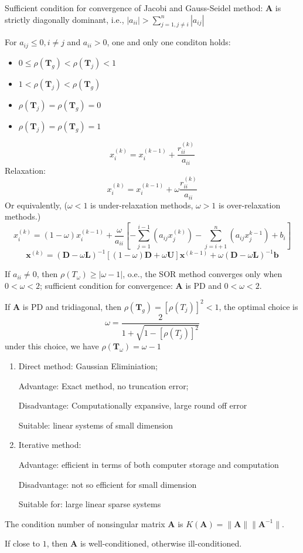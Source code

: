 \begin{proposition}
Sufficient condition for convergence of Jacobi and Gauss-Seidel method: $\bm A$ is strictly diagonally dominant, i.e., $|a_{ii}|>\sum_{j=1,j\ne i}^n|a_{ij}|$
\end{proposition}
\begin{proposition}
For $a_{ij}\le0, i\ne j$ and $a_{ii}>0$, one and only one conditon holds:
\begin{itemize}
\item
$0\le\rho(\bm T_g)<\rho(\bm T_j)<1$
\item
$1<\rho(\bm T_j)<\rho(\bm T_g)$
\item
$\rho(\bm T_j)=\rho(\bm T_g)=0$
\item
$\rho(\bm T_j)=\rho(\bm T_g)=1$
\end{itemize}
\end{proposition}
\begin{definition}
\[
 x_i^{(k)}= x_i^{(k-1)}+\frac{r_{ii}^{(k)}}{a_{ii}}
\]
Relaxation:
\[
x_i^{(k)}= x_i^{(k-1)}+\omega\frac{r_{ii}^{(k)}}{a_{ii}}
\]
Or equivalently, ($\omega<1$ is under-relaxation methods, $\omega>1$ is over-relaxation methods.)
\[
x_i^{(k)}=
(1-\omega)x_i^{(k-1)}+
\frac{\omega}{a_{ii}}
\left[
-\sum_{j=1}^{i-1}(a_{ij}x_j^{(k)})-\sum_{j=i+1}^n(a_{ij}x_j^{k-1})+b_i
\right]
\]
\[
\bm x^{(k)}=(\bm D-\omega\bm L)^{-1}[(1-\omega)\bm D+\omega\bm U]\bm x^{(k-1)}
+
\omega(\bm D-\omega\bm L)^{-1}\bm b
\]
\end{definition}
\begin{proposition}
If $a_{ii}\ne0$, then $\rho(T_\omega)\ge|\omega-1|$, o.e., the SOR method converges only when $0<\omega<2$; sufficient condition for convergence: $\bm A$ is PD and $0<\omega<2$.
\end{proposition}
\begin{proposition}
If $\bm A$ is PD and tridiagonal, then $\rho(\bm T_g)=[\rho(T_j)]^2<1$, the optimal choice is
\[
\omega=\frac{2}{1+\sqrt{1-[\rho(T_j)]^2}}
\]
under this choice, we have $\rho(\bm T_\omega)=\omega-1$
\end{proposition}
\begin{enumerate}
\item
Direct method: Gaussian Eliminiation;

Advantage: Exact method, no truncation error;

Disadvantage: Computationally expansive, large round off error

Suitable: linear systems of small dimension 
\item
Iterative method:

Advantage: efficient in terms of both computer storage and computation

Disadvantage: not so efficient for small dimension

Suitable for: large linear sparse systems
\end{enumerate}
\begin{definition}
The condition number of nonsingular matrix $\bm A$ is $K(\bm A)=\|\bm A\|\|\bm A^{-1}\|$.

If close to $1$, then $\bm A$ is well-conditioned, otherwise ill-conditioned.
\end{definition}

